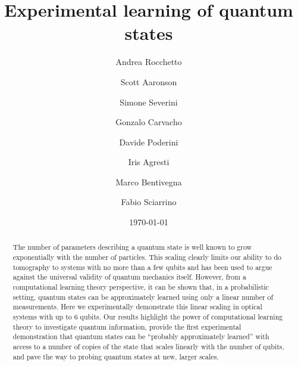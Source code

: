 \documentclass[aps,superscriptaddress,nofootinbib,twocolumn]{revtex4-1}
\begin{document}
\date{\today}

\title{Experimental learning of quantum states}

\author{Andrea Rocchetto}
\author{Scott Aaronson}
\author{Simone Severini}
\author{Gonzalo Carvacho}
\author{Davide Poderini}
\author{Iris Agresti}
\author{Marco Bentivegna}
\author{Fabio Sciarrino}


\begin{abstract}
The number of parameters describing a quantum state is well known to grow
exponentially with the number of particles. This scaling clearly limits our
ability to do tomography to systems with no more than a few qubits and has
been used to argue against the universal validity of quantum mechanics itself.
However, from a computational learning theory perspective, it can be shown that,
in a probabilistic setting, quantum states can be approximately learned using
only a linear number of measurements. Here we experimentally demonstrate this
linear scaling in optical systems with up to $6$ qubits. Our results highlight
the power of computational learning theory to investigate quantum information,
provide the first experimental demonstration that quantum states can be
``probably approximately learned'' with access to a number of copies of the
state that scales linearly with the number of qubits, and pave the way to
probing quantum states at new, larger scales.
\end{abstract}

\maketitle
\end{document}
